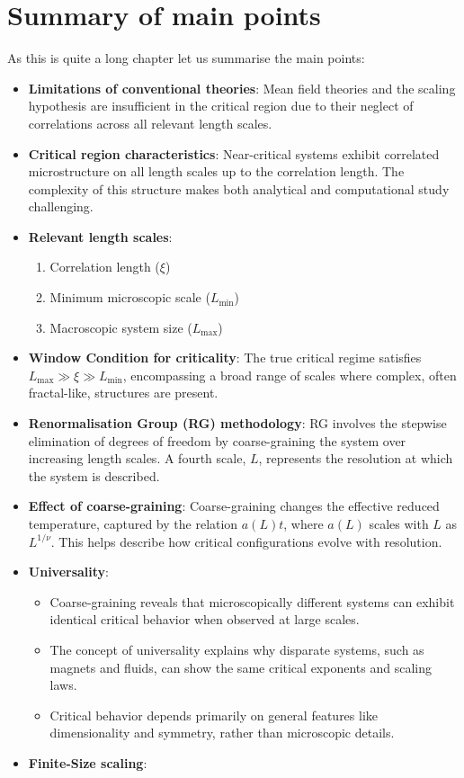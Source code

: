 \documentclass[
  letterpaper,
  enabledeprecatedfontcommands]{report}
\providecommand{\tightlist}{%
  \setlength{\itemsep}{0pt}\setlength{\parskip}{0pt}}
\begin{document}
\section{Summary of main points}\label{summary-of-main-points}

As this is quite a long chapter let us summarise the main points:

\begin{itemize}
\item
  \textbf{Limitations of conventional theories}: Mean field theories and
  the scaling hypothesis are insufficient in the critical region due to
  their neglect of correlations across all relevant length scales.
\item
  \textbf{Critical region characteristics}: Near-critical systems
  exhibit correlated microstructure on all length scales up to the
  correlation length. The complexity of this structure makes both
  analytical and computational study challenging.
\item
  \textbf{Relevant length scales}:

  \begin{enumerate}
  \def\labelenumi{\arabic{enumi}.}
  \tightlist
  \item
    Correlation length (\(\xi\))
  \item
    Minimum microscopic scale (\(L_\textrm{min}\))
  \item
    Macroscopic system size (\(L_\textrm{max}\))
  \end{enumerate}
\item
  \textbf{Window Condition for criticality}: The true critical regime
  satisfies \(L_\textrm{max} \gg \xi \gg L_\textrm{min}\), encompassing
  a broad range of scales where complex, often fractal-like, structures
  are present.
\item
  \textbf{Renormalisation Group (RG) methodology}: RG involves the
  stepwise elimination of degrees of freedom by coarse-graining the
  system over increasing length scales. A fourth scale, \(L\),
  represents the resolution at which the system is described.
\item
  \textbf{Effect of coarse-graining}: Coarse-graining changes the
  effective reduced temperature, captured by the relation \(a(L)t\),
  where \(a(L)\) scales with \(L\) as \(L^{1/\nu}\). This helps describe
  how critical configurations evolve with resolution.
\item
  \textbf{Universality}:

  \begin{itemize}
  \tightlist
  \item
    Coarse-graining reveals that microscopically different systems can
    exhibit identical critical behavior when observed at large scales.
  \item
    The concept of universality explains why disparate systems, such as
    magnets and fluids, can show the same critical exponents and scaling
    laws.
  \item
    Critical behavior depends primarily on general features like
    dimensionality and symmetry, rather than microscopic details.
  \end{itemize}
\item
  \textbf{Finite-Size scaling}:


\end{itemize}
\end{document}
